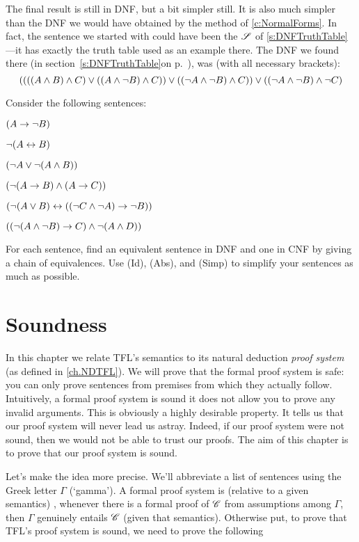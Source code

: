 The final result is still in DNF, but a bit simpler still.  It is also much simpler than the DNF we would have obtained by the method of \cref{c:NormalForms}. In fact, the sentence we started with could have been the $\mathscr{S}$ of \cref{s:DNFTruthTable}---it has exactly the truth table used as an example there. The DNF we found there (\ifHTMLtarget in section~\cref{s:DNFTruthTable}\else on p.~\pageref{longDNF}\fi), was (with all necessary brackets):
$$((((A \wedge B) \wedge C) \vee ((A \wedge \neg B) \wedge C)) \vee ((\neg A \wedge \neg B) \wedge C)) \vee ((\neg A \wedge \neg B) \wedge \neg C)$$

\practiceproblems
\problempart
\label{pr.DNF2}
Consider the following sentences:
\begin{compactlist}
	\item $(A \rightarrow \neg B)$
	\item $\neg (A \leftrightarrow B)$
	\item $(\neg A \vee \neg (A \wedge B))$
	\item $(\neg (A \rightarrow B ) \wedge (A \rightarrow C))$
	\item $(\neg (A \vee B) \leftrightarrow ((\neg C \wedge \neg A) \rightarrow \neg B))$
	\item $((\neg (A \wedge \neg B) \rightarrow C) \wedge \neg (A \wedge D))$
\end{compactlist}
For each sentence, find an equivalent sentence in DNF and one in CNF by giving a chain of equivalences. Use (Id), (Abs), and (Simp) to simplify your sentences as much as possible.

\chapter{Soundness}\label{ch:Soundness}

In this chapter we relate TFL's semantics to its natural deduction \emph{proof system} (as defined in \cref{ch.NDTFL}). We will prove that the formal proof system is safe: you can only prove sentences from premises from which they actually follow.
Intuitively, a formal proof system is sound \ifeff{} it does not allow you to prove any invalid arguments. This is obviously a highly desirable property. It tells us that our proof system will never lead us astray. Indeed, if our proof system were not sound, then we would not be able to trust our proofs. The aim of this chapter is to prove that our proof system is sound.

Let's make the idea more precise. We'll abbreviate a list of sentences using the Greek letter $\Gamma$ (`gamma'). A formal proof system is  (relative to a given semantics) \emph{\ifeff}, whenever there is a formal proof of $\mathscr{C}$ from assumptions among $\Gamma$, then $\Gamma$ genuinely entails $\mathscr{C}$ (given that semantics). Otherwise put, to prove that TFL's proof system is sound, we need to prove the following

